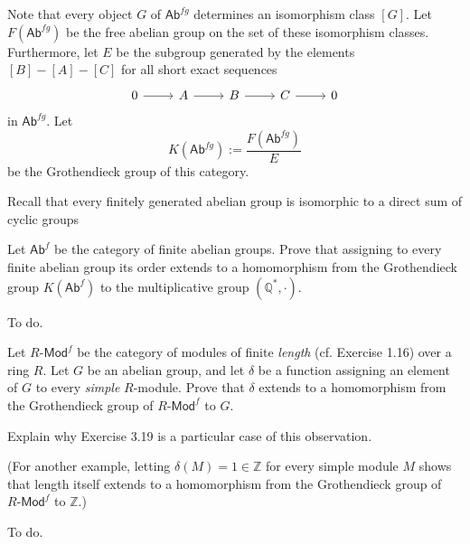 \documentclass[../../master.tex]{subfiles}
\begin{document}
\begin{solution}
    Note that every object $G$ of $\mathsf{Ab}^{fg}$ determines an isomorphism class $[G]$.
    Let $F(\mathsf{Ab}^{fg})$ be the free abelian group on the set of these isomorphism classes.
    Furthermore, let $E$ be the subgroup generated by the elements $[B] - [A] - [C]$ for all short exact sequences
    \[
    \begin{tikzcd}
        0 & A & B & C & 0
        \arrow[from=1-1, to=1-2] 
        \arrow[from=1-2, to=1-3]
        \arrow[from=1-3, to=1-4]
        \arrow[from=1-4, to=1-5] 
    \end{tikzcd}
    \]
    in $\mathsf{Ab}^{fg}$.
    Let
    \[
        K(\mathsf{Ab}^{fg}) := \frac{F(\mathsf{Ab}^{fg})}{E}
    \]
    be the Grothendieck group of this category.

    Recall that every finitely generated abelian group is isomorphic to a direct sum of cyclic groups
\end{solution}

\begin{problem}
    Let $\mathsf{Ab}^{f}$ be the category of finite abelian groups.
    Prove that assigning to every finite abelian group its order extends to a homomorphism from the Grothendieck group $K(\mathsf{Ab}^{f})$ to the multiplicative group $(\mathbb{Q}^{*}, \cdot)$.
\end{problem}

\begin{solution}
    To do.
\end{solution}

\begin{problem}
    Let $R\text{-}\mathsf{Mod}^{f}$ be the category of modules of finite \textit{length} (cf. Exercise 1.16) over a ring $R$.
    Let $G$ be an abelian group, and let $\delta$ be a function assigning an element of $G$ to every \textit{simple} $R$-module.
    Prove that $\delta$ extends to a homomorphism from the Grothendieck group of $R\text{-}\mathsf{Mod}^{f}$ to $G$.

    Explain why Exercise 3.19 is a particular case of this observation.

    (For another example, letting $\delta(M) = 1 \in \mathbb{Z}$ for every simple module $M$ shows that length itself extends to a homomorphism from the Grothendieck group of $R\text{-}\mathsf{Mod}^{f}$ to $\mathbb{Z}$.)
\end{problem}

\begin{solution}
    To do.
\end{solution}
\end{document}
